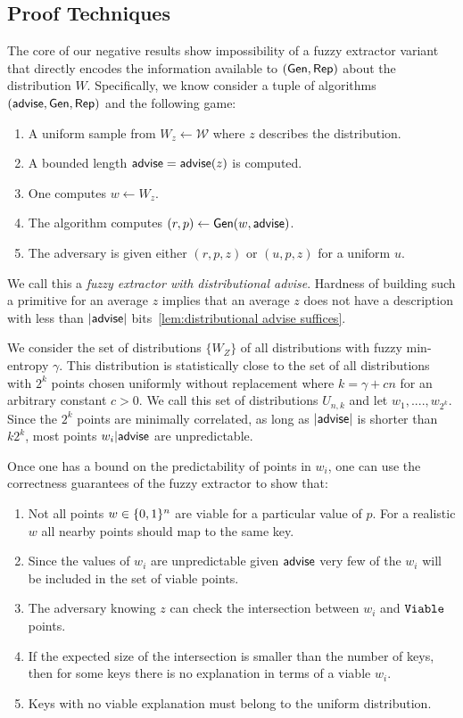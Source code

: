 \subsection{Proof Techniques}
The core of our negative results show impossibility of a fuzzy extractor variant that directly encodes the information available to $({\mathsf{Gen}}, {\mathsf{Rep}})$ about the distribution $W$.  Specifically, we know consider a tuple of algorithms $({\mathsf{advise}}, {\mathsf{Gen}}, {\mathsf{Rep}})$ and the following game:
\begin{enumerate}
\itemsep0em
\item A uniform sample from $W_z\leftarrow \mathcal{W}$ where $z$ describes the distribution.
\item A bounded length ${\mathsf{advise}} = {\mathsf{advise}}(z)$ is computed.
\item One computes $w\leftarrow W_z$.
\item The algorithm computes $(r, p)\leftarrow {\ensuremath{\mathsf{Gen}}}(w, {\mathsf{advise}})$.
\item The adversary is given either $(r, p, z)$ or $(u, p, z)$ for a uniform $u$.
\end{enumerate}
We call this a \emph{fuzzy extractor with distributional advise}.  Hardness of building such a primitive for an average $z$ implies that an average $z$ does not have a description with less than $|{\mathsf{advise}}|$ bits~\ref{lem:distributional advise suffices}. 

We consider the set of distributions $\{W_Z\}$ of all distributions with fuzzy min-entropy $\gamma$.  This distribution is statistically close to the set of all distributions with $2^k$ points chosen uniformly without replacement where $k = \gamma +cn$ for an arbitrary constant $c>0$.  We call this set of distributions $U_{n,k}$ and let $w_1,...., w_{2^k}$.  Since the  $2^k$ points are minimally correlated, as long as $|{\mathsf{advise}}|$ is shorter than $k2^k$, most points $w_i | {\mathsf{advise}}$ are unpredictable.  

Once one has a bound on the predictability of points in $w_i$, one can use the correctness guarantees of the fuzzy extractor to show that:
\begin{enumerate}
\item Not all points $w\in\{0, 1\}^n$ are viable for a particular value of $p$.  For a realistic $w$ all nearby points should map to the same key.
\item Since the values of $w_i$ are unpredictable given ${\mathsf{advise}}$ very few of the $w_i$ will be included in the set of viable points.
\item The adversary knowing $z$ can check the intersection between $w_i$ and $\mathtt{Viable}$ points.  
\item If the expected size of the intersection is smaller than the number of keys, then for some keys there is no explanation in terms of a viable $w_i$.
\item Keys with no viable explanation must belong to the uniform distribution.
\end{enumerate}

